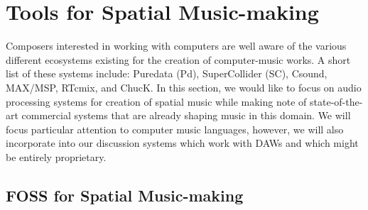 

\section{Tools for Spatial Music-making} \label{sec:open_tools_spat_mus}


Composers interested in working with computers are well aware of the various different ecosystems existing for the creation of computer-music works. A short list of these systems include: Puredata (Pd), SuperCollider (SC), Csound, MAX/MSP, RTcmix, and ChucK. In this section, we would like to focus on audio processing systems for creation of spatial music while making note of state-of-the-art commercial systems that are already shaping music in this domain. We will focus particular attention to computer music languages, however, we will also incorporate into our discussion systems which work with DAWs and which might be entirely proprietary. 



\subsection{FOSS for Spatial Music-making}

